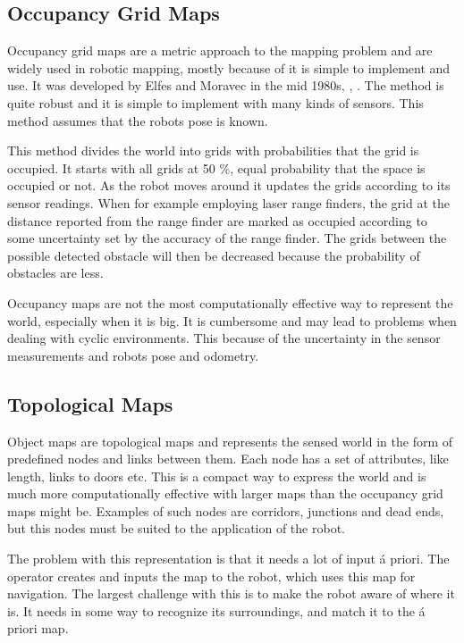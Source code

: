 \subsection{Occupancy Grid Maps}
Occupancy grid maps are a metric approach to the mapping problem and are widely used in 
robotic mapping, mostly because of it is simple to implement and use. It was developed 
by Elfes and Moravec in the mid 1980s, \cite{elfes}, \cite{moravec}. The method is quite 
robust and it is simple to implement with many kinds of sensors. This method assumes that 
the robots pose is known.

This method divides the world into grids with probabilities that the grid is occupied. It
starts with all grids at 50 \%, equal probability that the space is occupied or not. As
the robot moves around it updates the grids according to its sensor readings. When for
example employing laser range finders, the grid at the distance reported from the range
finder are marked as occupied according to some uncertainty set by the accuracy of the
range finder. The grids between the possible detected obstacle will then be decreased
because the probability of obstacles are less. 

Occupancy maps are not the most computationally effective way to represent the world,
especially when it is big. It is cumbersome and may lead to problems when dealing with
cyclic environments. This because of the uncertainty in the sensor measurements and robots
pose and odometry. 


\subsection{Topological Maps}
Object maps are topological maps and represents the sensed world in the form of predefined nodes and links
between them. Each node has a set of attributes, like length, links to doors etc. This is
a compact way to express the world and is much more computationally effective with larger
maps than the occupancy grid maps might be. Examples of such nodes are corridors,
junctions and dead ends, but this nodes must be suited to the application of the robot. 

The problem with this representation is that it needs a lot of input \'a priori. The
operator creates and inputs the map to the robot, which uses this map for navigation. The
largest challenge with this is to make the robot aware of where it is. It needs in some
way to recognize its surroundings, and match it to the \'a priori map.


